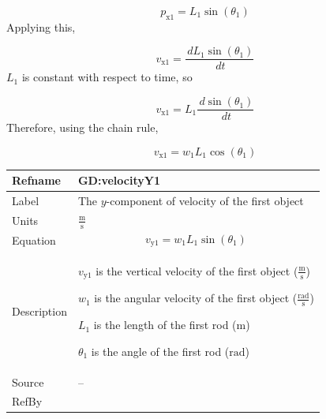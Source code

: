 \documentclass[12pt]{article}
\begin{document}
\begin{displaymath}
{p_{\text{x}1}}={L_{1}} \sin\left({θ_{1}}\right)
\end{displaymath}
Applying this,

\begin{displaymath}
{v_{\text{x}1}}=\frac{\,d{L_{1}} \sin\left({θ_{1}}\right)}{\,dt}
\end{displaymath}
${L_{1}}$ is constant with respect to time, so

\begin{displaymath}
{v_{\text{x}1}}={L_{1}} \frac{\,d\sin\left({θ_{1}}\right)}{\,dt}
\end{displaymath}
Therefore, using the chain rule,

\begin{displaymath}
{v_{\text{x}1}}={w_{1}} {L_{1}} \cos\left({θ_{1}}\right)
\end{displaymath}
\vspace{\baselineskip}
\noindent
\begin{minipage}{\textwidth}
\begin{tabular}{>{\raggedright}p{}>{\raggedright\arraybackslash}p{}}
\toprule \textbf{Refname} & \textbf{GD:velocityY1}
\label{GD:velocityY1}
\\ \midrule
Label & The $y$-component of velocity of the first object
        
\\ \midrule
Units & $\frac{\text{m}}{\text{s}}$
        
\\ \midrule
Equation & \begin{displaymath}
           {v_{\text{y}1}}={w_{1}} {L_{1}} \sin\left({θ_{1}}\right)
           \end{displaymath}
\\ \midrule
Description & \begin{symbDescription}
              \item{${v_{\text{y}1}}$ is the vertical velocity of the first object ($\frac{\text{m}}{\text{s}}$)}
              \item{${w_{1}}$ is the angular velocity of the first object ($\frac{\text{rad}}{\text{s}}$)}
              \item{${L_{1}}$ is the length of the first rod (${\text{m}}$)}
              \item{${θ_{1}}$ is the angle of the first rod (${\text{rad}}$)}
              \end{symbDescription}
\\ \midrule
Source & --
         
\\ \midrule
RefBy & 
\\ \bottomrule
\end{tabular}
\end{minipage}
\end{document}
